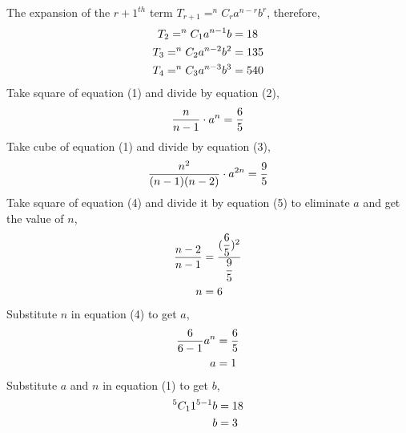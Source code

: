 \begin{solution}
  The expansion of the $r+1^{th}$ term $T_{r+1} = ^nC_r a^{n-r}b^r$, 
  therefore,
  \begin{align}
    T_2 = ^nC_1 a^{n-1} b   &= 18 \\
    T_3 = ^nC_2 a^{n-2} b^2 &= 135 \\
    T_4 = ^nC_3 a^{n-3} b^3 &= 540
  \end{align}
  Take square of equation (1) and divide by equation (2),
  \begin{align}
    \dfrac{n}{n-1}\cdot a^n = \dfrac{6}{5}
  \end{align}
  Take cube of equation (1) and divide by equation (3),
  \begin{align}
    \dfrac{n^2}{(n-1)(n-2)}\cdot a^{2n} = \dfrac{9}{5}
  \end{align}
  Take square of equation (4) and divide it by equation (5)
  to eliminate $a$ and get the value of $n$,
  \begin{align}
    \dfrac{n-2}{n-1} &= \dfrac{({\dfrac{6}{5}})^2}{\dfrac{9}{5}} \\
                   n &= 6
  \end{align}
  Substitute $n$ in equation (4) to get $a$,
  \begin{align}
    \dfrac{6}{6 -1} a^n &= \dfrac{6}{5} \\
                              a   &= 1 
  \end{align}
  Substitute $a$ and $n$ in equation (1) to get $b$,
  \begin{align}
      ^5C_1 1^{5-1} b &= 18 \\
                         b &= 3
  \end{align}
\end{solution}
